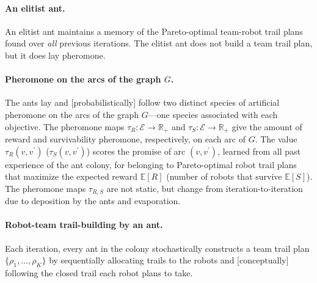 \documentclass[11pt, oneside]{article}
\begin{document}
\paragraph{An elitist ant.} An elitist ant \cite{dorigo1996ant} maintains a memory of the Pareto-optimal team-robot trail plans found over \emph{all} previous iterations. The elitist ant does not build a team trail plan, but it does lay pheromone.


\paragraph{Pheromone on the arcs of the graph $G$.}
The ants lay and [probabilistically] follow two distinct species of artificial pheromone on the arcs of the graph $G$---one species associated with each objective. 
The pheromone maps $\tau_R:\mathcal{E}\rightarrow \mathbb{R}_+$ and $\tau_S:\mathcal{E}\rightarrow \mathbb{R}_+$ give the amount of reward and survivability pheromone, respectively, on each arc of $G$.
The value $\tau_R(v, v^\prime)$ ($\tau_S(v, v^\prime)$) scores the promise of arc $(v, v^\prime)$, learned from all past experience of the ant colony, for belonging to Pareto-optimal robot trail plans that maximize the expected reward $\mathbb{E}[R]$ (number of robots that survive $\mathbb{E}[S]$).
The pheromone maps $\tau_{R,S}$ are not static, but change from iteration-to-iteration due to deposition by the ants and evaporation. 

 
\paragraph{Robot-team trail-building by an ant.}
Each iteration, every ant in the colony stochastically constructs a team trail plan $\{\rho_1, ..., \rho_K\}$ by sequentially allocating trails to the robots and [conceptually] following the closed trail each robot plans to take.
\end{document}
